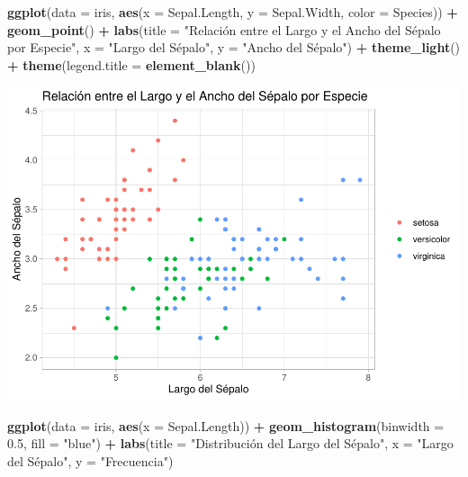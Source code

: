 \documentclass[
]{book}
\newenvironment{Shaded}{\begin{snugshade}}{\end{snugshade}}
\newcommand{\AttributeTok}[1]{\textcolor[rgb]{0.13,0.29,0.53}{#1}}
\newcommand{\FloatTok}[1]{\textcolor[rgb]{0.00,0.00,0.81}{#1}}
\newcommand{\FunctionTok}[1]{\textcolor[rgb]{0.13,0.29,0.53}{\textbf{#1}}}
\newcommand{\NormalTok}[1]{#1}
\newcommand{\SpecialCharTok}[1]{\textcolor[rgb]{0.81,0.36,0.00}{\textbf{#1}}}
\newcommand{\StringTok}[1]{\textcolor[rgb]{0.31,0.60,0.02}{#1}}
\begin{document}
\begin{Shaded}
\begin{Highlighting}[]
\FunctionTok{ggplot}\NormalTok{(}\AttributeTok{data =}\NormalTok{ iris, }\FunctionTok{aes}\NormalTok{(}\AttributeTok{x =}\NormalTok{ Sepal.Length, }\AttributeTok{y =}\NormalTok{ Sepal.Width, }\AttributeTok{color =}\NormalTok{ Species)) }\SpecialCharTok{+} 
  \FunctionTok{geom\_point}\NormalTok{() }\SpecialCharTok{+}
  \FunctionTok{labs}\NormalTok{(}\AttributeTok{title =} \StringTok{"Relación entre el Largo y el Ancho del Sépalo por Especie"}\NormalTok{,}
       \AttributeTok{x =} \StringTok{"Largo del Sépalo"}\NormalTok{,}
       \AttributeTok{y =} \StringTok{"Ancho del Sépalo"}\NormalTok{) }\SpecialCharTok{+}
  \FunctionTok{theme\_light}\NormalTok{() }\SpecialCharTok{+}
  \FunctionTok{theme}\NormalTok{(}\AttributeTok{legend.title =} \FunctionTok{element\_blank}\NormalTok{())}
\end{Highlighting}
\end{Shaded}

\includegraphics{bookdown-demo_files/figure-latex/unnamed-chunk-177-1.pdf}

\begin{Shaded}
\begin{Highlighting}[]
\FunctionTok{ggplot}\NormalTok{(}\AttributeTok{data =}\NormalTok{ iris, }\FunctionTok{aes}\NormalTok{(}\AttributeTok{x =}\NormalTok{ Sepal.Length)) }\SpecialCharTok{+} 
  \FunctionTok{geom\_histogram}\NormalTok{(}\AttributeTok{binwidth =} \FloatTok{0.5}\NormalTok{, }\AttributeTok{fill =} \StringTok{"blue"}\NormalTok{) }\SpecialCharTok{+}
  \FunctionTok{labs}\NormalTok{(}\AttributeTok{title =} \StringTok{"Distribución del Largo del Sépalo"}\NormalTok{,}
       \AttributeTok{x =} \StringTok{"Largo del Sépalo"}\NormalTok{,}
       \AttributeTok{y =} \StringTok{"Frecuencia"}\NormalTok{)}
\end{Highlighting}
\end{Shaded}
\end{document}
